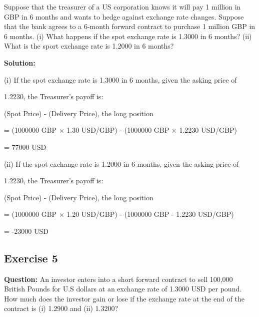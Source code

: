 \documentclass{article}
\begin{document}
\noindent Suppose that the treasurer of a US corporation knows it will pay 1 million in GBP in 6 months and wants to hedge against exchange rate changes. Suppose that the bank agrees to a 6-month forward contract to purchase 1 million GBP in 6 months. (i) What happens if the spot exchange rate is 1.3000 in 6 months? (ii) What is the sport exchange rate is 1.2000 in 6 months?

\textbf{Solution:}

(i) If the spot exchange rate is 1.3000 in 6 months, given the asking price of 

1.2230, the Treasurer's payoff is:

\vspace{\baselineskip}

\indent (Spot Price) - (Delivery Price), the long position

\vspace{\baselineskip}

\indent = (1000000 GBP × 1.30 USD/GBP) - (1000000 GBP × 1.2230 USD/GBP) 

\vspace{\baselineskip}

= 77000 USD 

\vspace{\baselineskip}

(ii) If the spot exchange rate is 1.2000 in 6 months, given the asking price of

1.2230, the Treasurer's payoff is:

\vspace{\baselineskip}

\indent (Spot Price) - (Delivery Price), the long position

\vspace{\baselineskip}

\indent = (1000000 GBP × 1.20 USD/GBP) - (1000000 GBP - 1.2230 USD/GBP) 

\vspace{\baselineskip}

= -23000 USD



\subsection*{Exercise 5}

\textbf{Question:} An investor enters into a short forward contract to sell 100,000 British Pounds for U.S dollars at an exchange rate of 1.3000 USD per pound. How much does the investor gain or lose if the exchange rate at the end of the contract is (i) 1.2900 and (ii) 1.3200?
\end{document}
